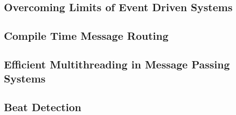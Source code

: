 \documentclass{beamer}
\begin{document}
	\subsection{Overcoming Limits of Event Driven Systems}
	\begin{frame}
		\subsectionpage
	\end{frame}
	
	\subsection{Compile Time Message Routing}
	\begin{frame}
		\subsectionpage
	\end{frame}
	
	\subsection{Efficient Multithreading in Message Passing Systems}
	\begin{frame}
		\subsectionpage
	\end{frame}
	
	\subsection{Beat Detection}
	\begin{frame}
		\subsectionpage
	\end{frame}
\end{document}

